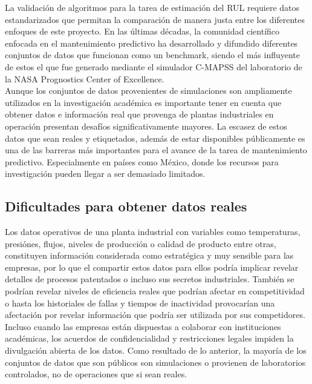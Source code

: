 La validación de algoritmos para la tarea de estimación del RUL requiere datos estandarizados que permitan la comparación de manera justa entre los diferentes enfoques de este proyecto. En las últimas décadas, la comunidad científico enfocada en el mantenimiento predictivo ha desarrollado y difundido diferentes conjuntos de datos que funcionan como un benchmark, siendo el más influyente de estos el que fue generado mediante el simulador C-MAPSS del laboratorio de la NASA Prognostics Center of Excellence.\\[.15cm]

Aunque los conjuntos de datos provenientes de simulaciones son ampliamente utilizados en la investigación académica es importante tener en cuenta que obtener datos e información real que provenga de plantas industriales en operación presentan desafíos significativamente mayores. La escasez de estos datos que sean reales y etiquetados, además de estar disponibles públicamente es una de las barreras más importantes para el avance de la tarea de mantenimiento predictivo. Especialmente en países como México, donde los recursos para investigación pueden llegar a ser demasiado limitados.\\[.15cm]

\subsection{Dificultades para obtener datos reales}

Los datos operativos de una planta industrial con variables como temperaturas, presiónes, flujos, niveles de producción o calidad de producto entre otras, constituyen información considerada como estratégica y muy sensible para las empresas, por lo que el compartir estos datos para ellos podría implicar revelar detalles de procesos patentados o incluso sus secretos industriales. También se podrían revelar niveles de eficiencia reales que podrían afectar en competitividad o hasta los historiales de fallas y tiempos de inactividad provocarían una afectación por revelar información que podría ser utilizada por sus competidores. Incluso cuando las empresas están dispuestas a colaborar con instituciones académicas, los acuerdos de confidencialidad y restricciones legales impiden la divulgación abierta de los datos. Como resultado de lo anterior, la mayoría de los conjuntos de datos que son públicos son simulaciones o provienen de laboratorios controlados, no de operaciones que si  sean reales.\\[.15cm]

